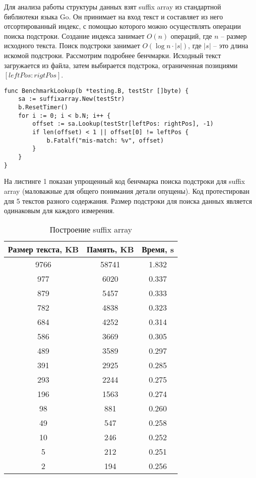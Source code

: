 
Для анализа работы структуры данных взят suffix array из стандартной библиотеки языка Go.
Он принимает на вход текст и составляет из него отсортированный индекс, с помощью которого можно осуществлять
операции поиска подстроки. Создание индекса занимает $O(n)$ операций, где $n$ -- размер исходного текста.
Поиск подстроки занимает $O(\log n \cdot |s|)$, где $|s|$ -- это длина искомой подстроки.
Рассмотрим подробнее бенчмарки. Исходный текст загружается из файла, затем выбирается подстрока,
ограниченная позициями $[leftPos:rigtPos]$.

\begin{lstlisting}[caption=Suffix array example]
func BenchmarkLookup(b *testing.B, testStr []byte) {
    sa := suffixarray.New(testStr)
    b.ResetTimer()
    for i := 0; i < b.N; i++ {
        offset := sa.Lookup(testStr[leftPos: rightPos], -1)
        if len(offset) < 1 || offset[0] != leftPos {
            b.Fatalf("mis-match: %v", offset)
        }
    }
}
\end{lstlisting}

На листинге 1 показан упрощенный код бенчмарка поиска подстроки для suffix array
(маловажные для общего понимания детали опущены). Код протестирован для 5 текстов разного содержания.
Размер подстроки для поиска данных является одинаковым для каждого измерения.

\begin{table}[h!]
    \centering
    \begin{tabular}{|c|c|c|}
        \hline
        Размер текста, KB & Память, KB & Время, s\\
        \hline
        9766 & 58741 & 1.832\\
        \hline
        977 & 6020 & 0.337\\
        \hline
        879 & 5457 & 0.333\\
        \hline
        782 & 4838 & 0.323\\
        \hline
        684 & 4252 & 0.314\\
        \hline
        586 & 3669 & 0.305\\
        \hline
        489 & 3589 & 0.297\\
        \hline
        391 & 2925 & 0.285\\
        \hline
        293 & 2244 & 0.275\\
        \hline
        196 & 1563 & 0.274\\
        \hline
        98 & 881 & 0.260\\
        \hline
        49 & 547 & 0.258\\
        \hline
        10 & 246 & 0.252\\
        \hline
        5 & 212 & 0.251\\
        \hline
        2 & 194 & 0.256\\
        \hline
    \end{tabular}
    \caption{Построение suffix array}
    \label{table:2}
\end{table}

